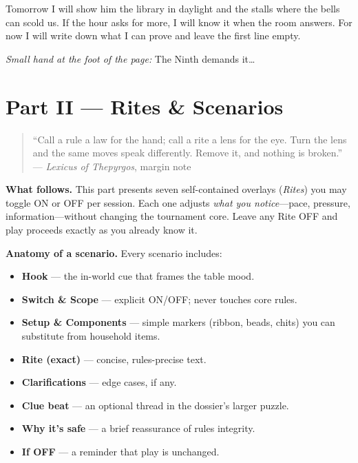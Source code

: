 \documentclass[11pt]{article}
\begin{document}
\medskip
Tomorrow I will show him the library in daylight and the stalls where the bells can scold us. If the hour asks for more, I will know it when the room answers. For now I will write down what I can prove and leave the first line empty.

\medskip
\noindent\textit{Small hand at the foot of the page:} The Ninth demands it\ldots{}

\section*{Part II — Rites \& Scenarios}
\label{part:rites}
{}

\begin{quote}\small
``Call a rule a law for the hand; call a rite a lens for the eye.  
Turn the lens and the same moves speak differently. Remove it, and nothing is broken.''\\
\hfill — \textit{Lexicus of Thepyrgos}, margin note
\end{quote}

\noindent\textbf{What follows.} This part presents seven self-contained overlays (\emph{Rites}) you may toggle \textsc{ON} or \textsc{OFF} per session. Each one adjusts \textit{what you notice}—pace, pressure, information—without changing the tournament core. Leave any Rite \textsc{OFF} and play proceeds exactly as you already know it.

\medskip
\noindent\textbf{Anatomy of a scenario.} Every scenario includes:
\begin{itemize}\setlength\itemsep{0.3em}
  \item \textbf{Hook} — the in-world cue that frames the table mood.
  \item \textbf{Switch \& Scope} — explicit \textsc{ON/OFF}; never touches core rules.
  \item \textbf{Setup \& Components} — simple markers (ribbon, beads, chits) you can substitute from household items.
  \item \textbf{Rite (exact)} — concise, rules-precise text.
  \item \textbf{Clarifications} — edge cases, if any.
  \item \textbf{Clue beat} — an optional thread in the dossier’s larger puzzle.
  \item \textbf{Why it’s safe} — a brief reassurance of rules integrity.
  \item \textbf{If \textsc{OFF}} — a reminder that play is unchanged.
\end{itemize}
\end{document}
